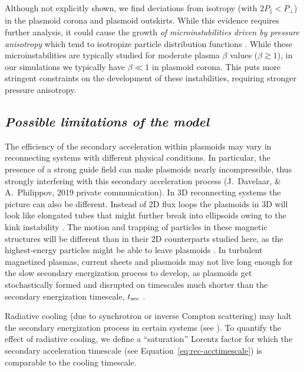 Although not explicitly shown, we find deviations from isotropy (with $2P_{\parallel}<P_{\perp}$) in the plasmoid corona and plasmoid outskirts. While this evidence requires further analysis, it could cause the growth {\it of microinstabilities driven by pressure anisotropy} which tend to isotropize particle distribution functions \citep[e.g.,][]{2014PhRvL.112t5003K}. While these microinstabilities are typically studied for moderate plasma $\beta$ values ($\beta\gtrsim 1$), in our simulations we typically have $\beta\ll 1$ in plasmoid corona. This puts more stringent constraints on the development of these instabilities, requiring stronger pressure anisotropy.

\subsection*{\small\it Possible limitations of the model} 
The efficiency of the secondary acceleration within plasmoids may vary in reconnecting systems with different physical conditions. In particular, the presence of a strong guide field can make plasmoids nearly incompressible, thus strongly interfering with this secondary acceleration process (J.~Davelaar, \& A.~Philippov, 2019 private communication). In 3D reconnecting systems the picture can also be different. Instead of 2D flux loops the plasmoids in 3D will look like elongated tubes that might further break into ellipsoids owing to the kink instability \citep[e.g.,][]{2011PhPl...18e2105L, 2014ApJ...783L..21S}. The motion and trapping of particles in these magnetic structures will be different than in their 2D counterparts studied here, as the highest-energy particles might be able to leave plasmoids \citep[e.g.,][]{2019ApJ...884..118L}. In turbulent magnetized plasmas, current sheets and plasmoids may not live long enough for the slow secondary energization process to develop, as plasmoids get stochastically formed and disrupted on timescales much shorter than the secondary energization timescale, $t_{\rm sec}$ \citep[e.g.,][]{2017PhRvL.118e5103Z, 2018PhRvL.121y5101C}.

Radiative cooling (due to synchrotron or inverse Compton scattering) may halt the secondary energization process in certain systems (see \citealt{2018JPlPh..84c7501N, 2019ApJ...877...53H, 2019MNRAS.482L..60W}). To quantify the effect of radiative cooling, we define a ``saturation'' Lorentz factor for which the secondary acceleration timescale (see Equation~\eqref{eq:rec-acctimescale}) is comparable to the cooling timescale.

